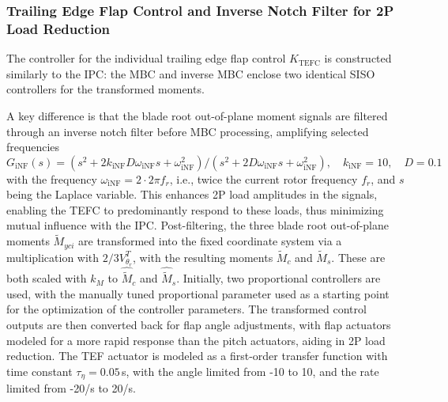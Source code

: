 \subsubsection*{Trailing Edge Flap Control and Inverse Notch Filter for 2P Load Reduction}
The controller for the individual trailing edge flap control $K_{\text{TEFC}}$ is constructed similarly to the IPC: the MBC and inverse MBC enclose two identical SISO controllers for the transformed moments.

A key difference is that the blade root out-of-plane moment signals are filtered through an inverse notch filter before MBC processing, amplifying selected frequencies
\begin{equation*}
    G_{\text{iNF}}(s) = (s^2 +2k_{\text{iNF}}D\omega_{\text{iNF}}s +\omega_{\text{iNF}}^2)/ (s^2 +2D\omega_{\text{iNF}}s +\omega_{\text{iNF}}^2),\quad k_{\text{iNF}}=10,\quad D = 0.1
\end{equation*}
with the frequency $\omega_{\text{iNF}} = 2 \cdot 2\pi f_r$, i.e., twice the current rotor frequency $f_r$, and $s$ being the Laplace variable. This enhances 2P load amplitudes in the signals, enabling the TEFC to predominantly respond to these loads, thus minimizing mutual influence with the IPC. Post-filtering, the three blade root out-of-plane moments $\tilde{M}_{yci}$ are transformed into the fixed coordinate system via a multiplication with $2/3 V^T_{\theta_r}$, with the resulting moments $\tilde{M}_{c}$ and $\tilde{M}_{s}$. These are both scaled with $k_M$ to $\hat{\tilde{M}}_c$ and $\hat{\tilde{M}}_s$. Initially, two proportional controllers are used, with the manually tuned proportional parameter used as a starting point for the optimization of the controller parameters. The transformed control outputs are then converted back for flap angle adjustments, with flap actuators modeled for a more rapid response than the pitch actuators, aiding in 2P load reduction. The TEF actuator is modeled as a first-order transfer function with time constant $\tau_{\eta}=0.05$\,s, with the angle limited from -10\textdegree{} to 10\textdegree{}, and the rate limited from -20\textdegree{}/s to 20\textdegree{}/s.


